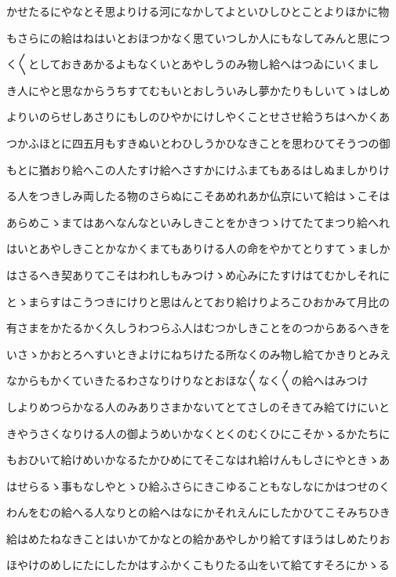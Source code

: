 \documentclass[a4paper,11pt,landscape]{ltjtarticle}
\begin{document}
かせたるにやなとそ思よりける河になかしてよといひしひとことよりほかに物
\par\medskip
もさらにの給はねはいとおほつかなく思ていつしか人にもなしてみんと思につ
\par\medskip
く〱としておきあかるよもなくいとあやしうのみ物し給へはつゐにいくまし
\par\medskip
き人にやと思なからうちすてむもいとおしういみし夢かたりもしいてゝはしめ
\par\medskip
よりいのらせしあさりにもしのひやかにけしやくことせさせ給うちはへかくあ
\par\medskip
つかふほとに四五月もすきぬいとわひしうかひなきことを思わひてそうつの御
\par\medskip
もとに猶おり給へこの人たすけ給へさすかにけふまてもあるはしぬましかりけ
\par\medskip
る人をつきしみ両したる物のさらぬにこそあめれあか仏京にいて給はゝこそは
\par\medskip
あらめこゝまてはあへなんなといみしきことをかきつゝけてたてまつり給へれ
\par\medskip
はいとあやしきことかなかくまてもありける人の命をやかてとりすてゝましか
\par\medskip
はさるへき契ありてこそはわれしもみつけゝめ心みにたすけはてむかしそれに
\par\medskip
とゝまらすはこうつきにけりと思はんとており給けりよろこひおかみて月比の
\par\medskip
有さまをかたるかく久しうわつらふ人はむつかしきことをのつからあるへきを
\par\medskip
いさゝかおとろへすいときよけにねちけたる所なくのみ物し給てかきりとみえ
\par\medskip
なからもかくていきたるわさなりけりなとおほな〱なく〱の給へはみつけ
\par\medskip
しよりめつらかなる人のみありさまかないてとてさしのそきてみ給てけにいと
\par\medskip
きやうさくなりける人の御ようめいかなくとくのむくひにこそかゝるかたちに
\par\medskip
もおひいて給けめいかなるたかひめにてそこなはれ給けんもしさにやときゝあ
\par\medskip
はせらるゝ事もなしやとゝひ給ふさらにきこゆることもなしなにかはつせのく
\par\medskip
わんをむの給へる人なりとの給へはなにかそれえんにしたかひてこそみちひき
\par\medskip
給はめたねなきことはいかてかなとの給かあやしかり給てすほうはしめたりお
\par\medskip
ほやけのめしにたにしたかはすふかくこもりたる山をいて給てすそろにかゝる
\end{document}
